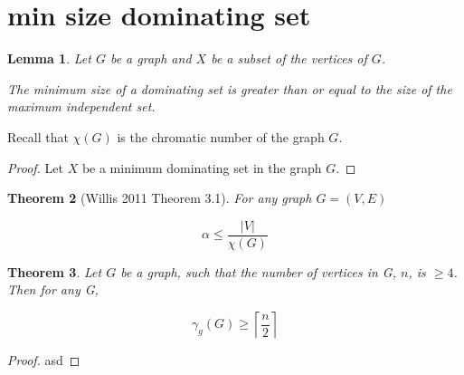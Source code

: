\documentclass[11pt
              , a4paper
              , twoside
              , openright
              ]{report}
\newtheorem{theorem}{Theorem}[chapter]
\newtheorem{lemma}[theorem]{Lemma}
\theoremstyle{definition}
\begin{document}
\section{min size dominating set}

\begin{lemma}
    Let $G$ be a graph and $X$ be a subset of the vertices of $G$. 
        
    The minimum size of a dominating set is greater than or equal to the size of the maximum independent set.
     
\end{lemma}

Recall that $\chi(G)$ is the chromatic number of the graph $G$.

\begin{proof}
    
    Let $X$ be a minimum dominating set in the graph $G$.
    
    
    
\end{proof}

\begin{theorem} [Willis 2011 Theorem 3.1] 
For any graph $G = (V,E)$ \cite{Willis2011BoundsFT}

    \[\alpha \leq \frac{|V|}{\chi(G)}\]


\end{theorem}

\begin{theorem} \label{minDomSize}
    Let $G$ be a graph, such that the number of vertices in G, $n$, is $\geq 4$. Then for any G,
    
    \[ \gamma_g(G) \geq \left \lceil{\frac{n}{2}}\right \rceil \]
    
\end{theorem}

\begin{proof}
asd    
\end{proof}


\backmatter



%


\end{document}
